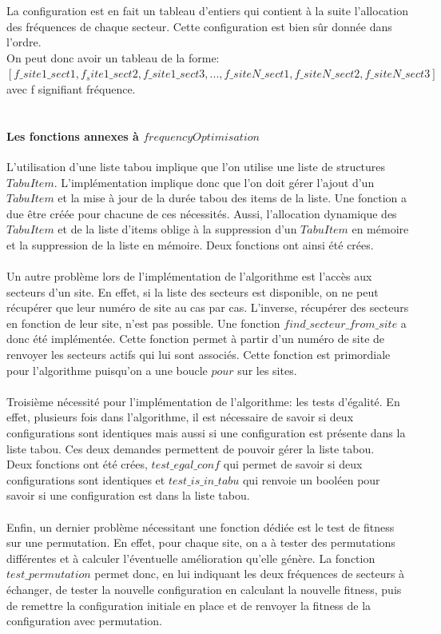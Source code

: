 \documentclass[a4paper, 11pt]{report}
\begin{document}
			La configuration est en fait un tableau d'entiers qui contient à la suite l'allocation des fréquences de chaque secteur. Cette configuration est bien sûr donnée dans l'ordre. \\
			On peut donc avoir un tableau de la forme:\\ $[f\_site1\_sect1, f_site1\_sect2, f\_site1\_sect3, ...,
 f\_siteN\_sect1, f\_siteN\_sect2, f\_siteN\_sect3]$\\
 avec f signifiant fréquence.\\ \ \\
 
 
 			\paragraph{Les fonctions annexes à $frequencyOptimisation$\\}
 	L'utilisation d'une liste tabou implique que l'on utilise une liste de structures $TabuItem$. L'implémentation implique donc que l'on doit gérer l'ajout d'un $TabuItem$ et la mise à jour de la durée tabou des items de la liste. Une fonction a due être créée pour chacune de ces nécessités.
 	Aussi, l'allocation dynamique des $TabuItem$ et de la liste d'items oblige à la suppression d'un $TabuItem$ en mémoire et la suppression de la liste en mémoire. Deux fonctions ont ainsi été crées.\\ \ \\
 	Un autre problème lors de l'implémentation de l'algorithme est l'accès aux secteurs d'un site. En effet, si la liste des secteurs est disponible, on ne peut récupérer que leur numéro de site au cas par cas. L'inverse, récupérer des secteurs en fonction de leur site, n'est pas possible. Une fonction $find\_secteur\_from\_site$ a donc été implémentée. Cette fonction permet à partir d'un numéro de site de renvoyer les secteurs actifs qui lui sont associés. Cette fonction est primordiale pour l'algorithme puisqu'on a une boucle $pour$ sur les sites.\\ \ \\
	Troisième nécessité pour l'implémentation de l'algorithme: les tests d'égalité. En effet, plusieurs fois dans l'algorithme, il est nécessaire de savoir si deux configurations sont identiques mais aussi si une configuration est présente dans la liste tabou. Ces deux demandes permettent de pouvoir gérer la liste tabou.\\
	Deux fonctions ont été crées, $test\_egal\_conf$ qui permet de savoir si deux configurations sont identiques et $test\_is\_in\_tabu$ qui renvoie un booléen pour savoir si une configuration est dans la liste tabou.\\ \ \\
	Enfin, un dernier problème nécessitant une fonction dédiée est le test de fitness sur une permutation. En effet, pour chaque site, on a à tester des permutations différentes et à calculer l'éventuelle amélioration qu'elle génère. La fonction $test\_permutation$ permet donc, en lui indiquant les deux fréquences de secteurs à échanger, de tester la nouvelle configuration en calculant la nouvelle fitness, puis de remettre la configuration initiale en place et de renvoyer la fitness de la configuration avec permutation.
	
\end{document}
